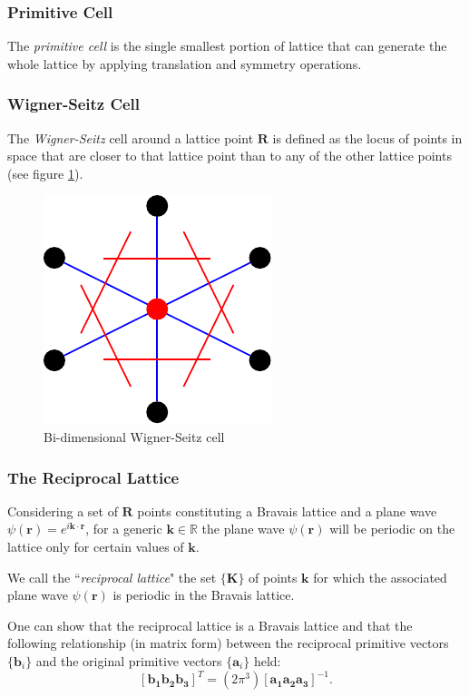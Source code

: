 \documentclass[a4paper,12pt]{article}
\newcommand\erre{\mathbf{r}}
\begin{document}
\subsubsection{Primitive Cell}
The \textit{primitive cell} is the single smallest portion of lattice that can generate the whole lattice by applying translation and symmetry operations.

\subsubsection{Wigner-Seitz Cell}

The \textit{Wigner-Seitz} cell around a lattice point $\mathbf{R}$ is defined as the locus of points in space that are closer to that lattice point than to any of the other lattice points (see figure \ref{fig:WSCell}).

\begin{figure}[h]
\begin{center}
	\includegraphics[width=0.4\linewidth]{Wigner.pdf}
	\caption{Bi-dimensional Wigner-Seitz cell}
	\label{fig:WSCell}
\end{center}
\end{figure}

\subsubsection{The Reciprocal Lattice}
Considering a set of $\mathbf{R}$ points constituting a Bravais lattice and a plane wave $\psi(\erre) = e^{i\mathbf{k}\cdot\mathbf{r}}$, for a generic $\mathbf{k} \in \mathbb{R}$ the plane wave $\psi(\erre)$ will be periodic on the lattice only for certain values of $\mathbf{k}$.


We call the ``\textit{reciprocal lattice}" the set $\{\mathbf{K}\}$ of points $\mathbf{k}$ for which the associated plane wave $\psi(\erre)$ is periodic in the Bravais lattice.

One can show \cite{Martin} that the reciprocal lattice is a Bravais lattice and that the following relationship (in matrix form) between the reciprocal primitive vectors $\{\mathbf{b}_i\}$ and the original primitive vectors $\{\mathbf{a}_i\}$ held:
\begin{equation}
\left[\mathbf{b_{1}b_{2}b_{3}}\right]^{T} = (2\pi^3) \left[\mathbf{a_{1}a_{2}a_{3}}\right]^{-1}
.
\end{equation}
\end{document}
